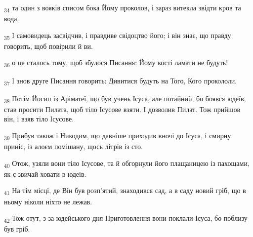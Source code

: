 \begin{tcolorbox}
\textsubscript{34} та один з вояків списом бока Йому проколов, і зараз витекла звідти кров та вода.
\end{tcolorbox}
\begin{tcolorbox}
\textsubscript{35} І самовидець засвідчив, і правдиве свідоцтво його; і він знає, що правду говорить, щоб повірили й ви.
\end{tcolorbox}
\begin{tcolorbox}
\textsubscript{36} о це сталось тому, щоб збулося Писання: Йому кості ламати не будуть!
\end{tcolorbox}
\begin{tcolorbox}
\textsubscript{37} І знов друге Писання говорить: Дивитися будуть на Того, Кого прокололи.
\end{tcolorbox}
\begin{tcolorbox}
\textsubscript{38} Потім Йосип із Аріматеї, що був учень Ісуса, але потайний, бо боявся юдеїв, став просити Пилата, щоб тіло Ісусове взяти. І дозволив Пилат. Тож прийшов він, і взяв тіло Ісусове.
\end{tcolorbox}
\begin{tcolorbox}
\textsubscript{39} Прибув також і Никодим, що давніше приходив вночі до Ісуса, і смирну приніс, із алоєм помішану, щось літрів із сто.
\end{tcolorbox}
\begin{tcolorbox}
\textsubscript{40} Отож, узяли вони тіло Ісусове, та й обгорнули його плащаницею із пахощами, як є звичай ховати в юдеїв.
\end{tcolorbox}
\begin{tcolorbox}
\textsubscript{41} На тім місці, де Він був розп'ятий, знаходився сад, а в саду новий гріб, що в ньому ніколи ніхто не лежав.
\end{tcolorbox}
\begin{tcolorbox}
\textsubscript{42} Тож отут, з-за юдейського дня Приготовлення вони поклали Ісуса, бо поблизу був гріб.
\end{tcolorbox}
